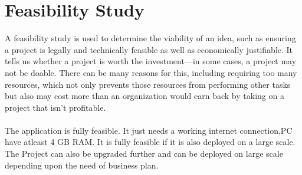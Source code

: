 \section{Feasibility Study}
A feasibility study is used to determine the viability of an idea, such as ensuring a project is legally and technically feasible as well as economically justifiable. It tells us whether a project is worth the investment—in some cases, a project may not be doable. There can be many reasons for this, including requiring too many resources, which not only prevents those resources from performing other tasks but also may cost more than an organization would earn back by taking on a project that isn’t profitable.\\
\\
The application is fully feasible. It just needs a working internet connection,PC have atleast 4 GB RAM. It is fully feasible if it is also deployed on a large scale.\\
The Project can also be upgraded further and can be deployed on large scale depending upon the need of business plan.\\
